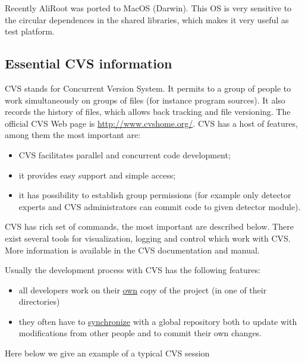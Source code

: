 \documentclass[12pt,a4paper,twoside]{article}
\begin{document}
Recently  AliRoot  was ported  to  MacOS  (Darwin).  This OS  is  very
sensitive to  the circular dependences in the  shared libraries, which
makes it very useful as test platform.


\subsection{Essential CVS information}

CVS\cite{CVS} stands  for Concurrent Version  System. It permits  to a
group  of  people to  work  simultaneously  on  groups of  files  (for
instance program sources). It also records the history of files, which
allows back tracking and file versioning. The official CVS Web page is
\url{http://www.cvshome.org/}. CVS has a  host of features, among them
the most important are:
\begin{itemize} 
\item CVS facilitates parallel and concurrent code development;
\item it provides easy support and simple access;
\item it has possibility to establish group permissions (for example
  only detector experts and CVS administrators can commit code to
  given detector module).
\end{itemize}
CVS has rich set of  commands, the most important are described below.
There exist several tools for visualization, logging and control which
work with CVS. More information  is available in the CVS documentation
and manual\cite{CVSManual}.

Usually the development process with CVS has the following features:
\begin{itemize}
\item all developers work on their \underline{own} copy of the project
  (in one of their directories)
\item they often have to \underline{synchronize} with a global
  repository both to update with modifications from other people and
  to commit their own changes.
\end{itemize}

Here below we give an example of a typical CVS session
\end{document}
